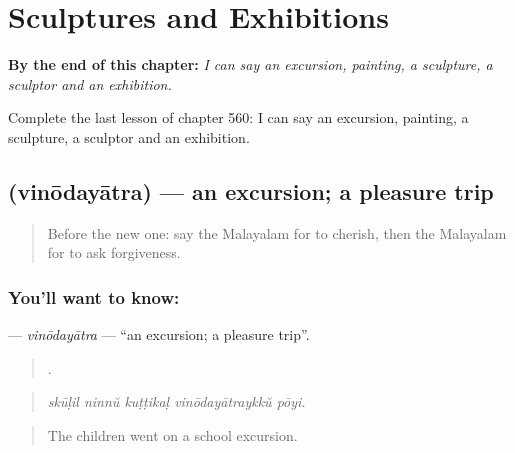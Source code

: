 
\chapter{Sculptures and Exhibitions}
\label{ch:ml-sculptures-and-exhibitions}

\begin{chapteropening}
\textbf{By the end of this chapter:} \emph{I can say an excursion, painting, a sculpture, a sculptor and an exhibition.}

Complete the last lesson of chapter 560: I can say an excursion, painting, a sculpture, a sculptor and an exhibition.
\end{chapteropening}

\section[\texorpdfstring{\ml{വിനോദയാത്ര} (vinōdayātra)}{വിനോദയാത്ര (vinōdayātra)}]{ (vinōdayātra) — an excursion; a pleasure trip}

\label{lesson:ML-C560-vinodayatra}



\begin{quote}
Before the new one: say the Malayalam for to cherish, then the Malayalam for to ask forgiveness.
\end{quote}

\subsection*{You'll want to know: }
\textbf{} — \emph{vinōdayātra} — \textquotedblleft{}an excursion; a pleasure trip\textquotedblright{}.

\begin{quote}
    .
\end{quote}

\begin{quote}
\emph{skūḷil ninnŭ kuṭṭikaḷ vinōdayātraykkŭ pōyi.}
\end{quote}

\begin{quote}
The children went on a school excursion.
\end{quote}

